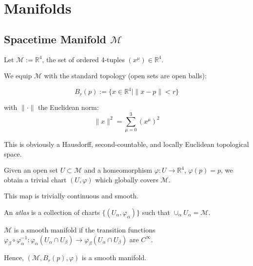 \chapter{Manifolds}


\section{Spacetime Manifold $\mathcal{M}$}\label{sec:spacetime-manifold}

Let $\mathcal{M} := \mathbb{R}^4$, the set of ordered 4-tuples $(x^\mu) \in \mathbb{R}^4$.

We equip $\mathcal{M}$ with the standard topology (open sets are open balls):

\[
B_r(p) := \{ x \in \mathbb{R}^4 \mid \|x - p\| < r \}
\]

with $\| \cdot \|$ the Euclidean norm:
\[
\|x\|^2 = \sum_{\mu=0}^3 (x^\mu)^2
\]

This is obviously a Hausdorff, second-countable, and locally Euclidean topological space.

Given an open set $U \subset \mathcal{M}$ and a homeomorphism $\varphi: U \to \mathbb{R}^4$, $\varphi(p) = p$, we obtain a trivial chart $(U, \varphi)$ which globally covers $\mathcal{M}$.

This map is trivially continuous and smooth.

An \textit{atlas} is a collection of charts $\{(U_\alpha, \varphi_\alpha)\}$ such that $\cup_\alpha U_\alpha = \mathcal{M}$.

$\mathcal{M}$ is a smooth manifold if the transition functions $\varphi_\beta \circ \varphi_\alpha^{-1}: \varphi_\alpha(U_\alpha \cap U_\beta) \to \varphi_\beta(U_\alpha \cap U_\beta)$ are $C^\infty$.

Hence, $(\mathcal{M}, B_r(p), \varphi)$ is a smooth manifold.
